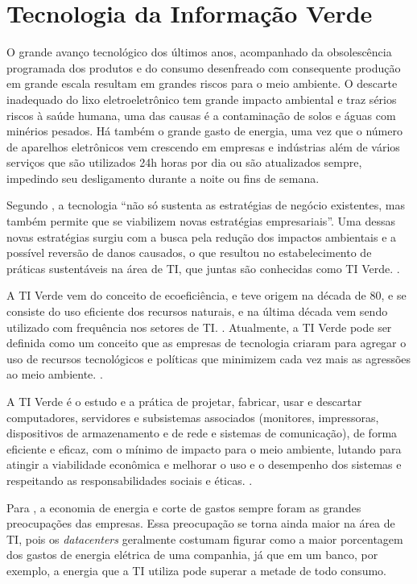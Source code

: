 \section{Tecnologia da Informação Verde}

O grande avanço tecnológico dos últimos anos, acompanhado da obsolescência programada dos produtos e do consumo desenfreado com consequente produção em grande escala resultam em grandes riscos para o meio ambiente. O descarte inadequado do lixo eletroeletrônico tem grande impacto ambiental e traz sérios riscos à saúde humana, uma das causas é a contaminação de solos e águas com minérios pesados. Há também o grande gasto de energia, uma vez que o número de aparelhos eletrônicos vem crescendo em empresas e indústrias além de vários serviços que são utilizados 24h horas por dia ou são atualizados sempre, impedindo seu desligamento durante a noite ou fins de semana.

Segundo , a tecnologia “não só sustenta as estratégias de negócio existentes, mas também permite que se viabilizem novas estratégias empresariais”. Uma dessas novas estratégias surgiu com a busca pela redução dos impactos ambientais e a possível reversão de danos causados, o que resultou no estabelecimento de práticas sustentáveis na área de TI, que juntas são conhecidas como TI Verde. \cite{aguilar2009tecnologia}.

A TI Verde vem do conceito de ecoeficiência, e teve origem na década de 80, e se consiste do uso eficiente dos recursos naturais, e na última década vem sendo utilizado com frequência nos setores de TI. \cite{ferreira2009tiverde}. Atualmente, a TI Verde pode ser definida como um conceito que as empresas de tecnologia criaram para agregar o uso de recursos tecnológicos e políticas que minimizem cada vez mais as agressões ao meio ambiente. \cite{briefing2008preciso}.

\begin{citacao}
A TI Verde é o estudo e a prática de projetar, fabricar,
usar e descartar computadores, servidores e subsistemas associados (monitores, impressoras, dispositivos de armazenamento e de rede e sistemas de comunicação), de forma eficiente e eficaz, com o mínimo de impacto para o meio ambiente, lutando para atingir a viabilidade econômica e melhorar o uso e o desempenho dos sistemas e respeitando as responsabilidades sociais e éticas. \cite{lunardi2014desenvolvimento}.
\end{citacao} 

Para , a economia de energia e corte de gastos sempre foram as grandes preocupações das empresas. Essa preocupação se torna ainda maior na área de TI, pois os \textit{datacenters} geralmente costumam figurar como a maior porcentagem dos gastos de energia elétrica de uma companhia, já que em um banco, por exemplo, a energia que a TI utiliza pode superar a metade de todo consumo.  

